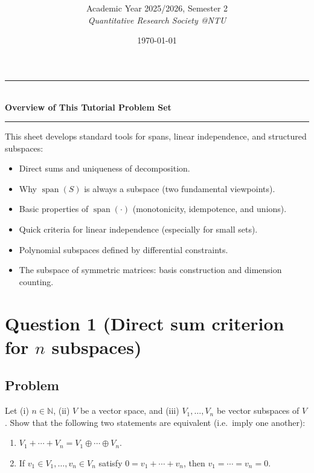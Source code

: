 \documentclass[12pt]{article}
\title{
\CourseCode\ \CourseName \\[0.3em]
\large \DocType
}
\author{
  Academic Year 2025/2026, Semester 2 \\[0.25em]
  \textit{Quantitative Research Society @NTU}
}
\date{\today}
\newcommand{\Span}{\operatorname{span}}
\begin{document}
\maketitle
\thispagestyle{plainfirst}
\pagestyle{main}
\bigskip

\begin{center}
  \rule{0.8\textwidth}{0.4pt}\\[4pt]
  \textbf{Overview of This Tutorial Problem Set}\\[2pt]
  \rule{0.8\textwidth}{0.4pt}
\end{center}

\noindent
This sheet develops standard tools for spans, linear independence, and structured subspaces:
\begin{itemize}[leftmargin=*]
  \item Direct sums and uniqueness of decomposition.
  \item Why \(\Span(S)\) is always a subspace (two fundamental viewpoints).
  \item Basic properties of \(\Span(\cdot)\) (monotonicity, idempotence, and unions).
  \item Quick criteria for linear independence (especially for small sets).
  \item Polynomial subspaces defined by differential constraints.
  \item The subspace of symmetric matrices: basis construction and dimension counting.
\end{itemize}

\bigskip
\newpage
\tableofcontents
\newpage
\section{Question 1 (Direct sum criterion for \(n\) subspaces)}
\subsection{Problem}
Let (i) \(n\in\mathbb{N}\), (ii) \(V\) be a vector space, and (iii) \(V_1,\ldots,V_n\) be vector subspaces of \(V\).
Show that the following two statements are equivalent (i.e.\ imply one another):
\begin{enumerate}[label=(\alph*)]
\item \(V_1+\cdots+V_n = V_1\oplus\cdots\oplus V_n.\)
\item If \(v_1\in V_1,\ldots,v_n\in V_n\) satisfy \(0=v_1+\cdots+v_n\), then \(v_1=\cdots=v_n=0\).
\end{enumerate}
\end{document}
